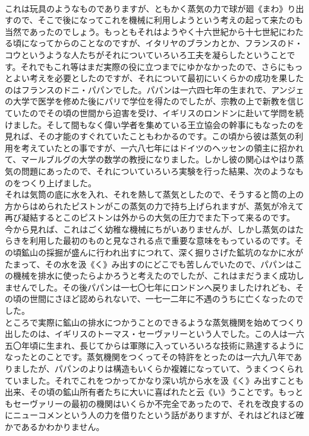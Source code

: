 \documentclass[8pt]{extreport}
\begin{document}
\begin{CJK}{UTF8}{min}
\\	これは玩具のようなものでありますが、ともかく蒸気の力で球が廻《まわ》り出すので、そこで後になってこれを機械に利用しようという考えの起って来たのも当然であったのでしょう。もっともそれはようやく十六世紀から十七世紀にわたる頃になってからのことなのですが、イタリヤのブランカとか、フランスのド・コウというような人たちがそれについていろいろ工夫を凝らしたということです。それでもこれ等はまだ実際の役に立つまでにゆかなかったので、さらにもっとよい考えを必要としたのですが、それについて最初にいくらかの成功を果したのはフランスのドニ・パパンでした。パパンは一六四七年の生まれで、アンジェの大学で医学を修めた後にパリで学位を得たのでしたが、宗教の上で新教を信じていたのでその頃の世間から迫害を受け、イギリスのロンドンに赴いて学問を続けました。そして間もなく偉い学者を集めている王立協会の幹事にもなったのを見れば、その才能のすぐれていたこともわかるのです。この頃から彼は蒸気の利用を考えていたとの事ですが、一六八七年にはドイツのヘッセンの領主に招かれて、マールブルグの大学の数学の教授になりました。しかし彼の関心はやはり蒸気の問題にあったので、それについていろいろ実験を行った結果、次のようなものをつくり上げました。
\\	それは気筒の底に水を入れ、それを熱して蒸気としたので、そうすると筒の上の方からはめられたピストンがこの蒸気の力で持ち上げられますが、蒸気が冷えて再び凝結するとこのピストンは外からの大気の圧力でまた下って来るのです。
\\	今から見れば、これはごく幼稚な機械にちがいありませんが、しかし蒸気のはたらきを利用した最初のものと見なされる点で重要な意味をもっているのです。その頃鉱山の採掘が盛んに行われ出すにつれて、深く掘りさげた鉱坑のなかに水がたまって、その水を汲《く》み出すのにどこでも苦しんでいたので、パパンはこの機械を排水に使ったらよかろうと考えたのでしたが、これはまだうまく成功しませんでした。その後パパンは一七〇七年にロンドンへ戻りましたけれども、その頃の世間にさほど認められないで、一七一二年に不遇のうちに亡くなったのでした。
\\	ところで実際に鉱山の排水につかうことのできるような蒸気機関を始めてつくり出したのは、イギリスのトーマス・セーヴァリーという人でした。この人は一六五〇年頃に生まれ、長じてからは軍隊に入っていろいろな技術に熟達するようになったとのことです。蒸気機関をつくってその特許をとったのは一六九八年でありましたが、パパンのよりは構造もいくらか複雑になっていて、うまくつくられていました。それでこれをつかってかなり深い坑から水を汲《く》み出すことも出来、その頃の鉱山所有者たちに大いに喜ばれたと云《い》うことです。もっともセーヴァリーの最初の機関はいくらか不完全であったので、それを改良するのにニューコメンという人の力を借りたという話がありますが、それはどれほど確かであるかわかりません。

\end{CJK}
\end{document}
